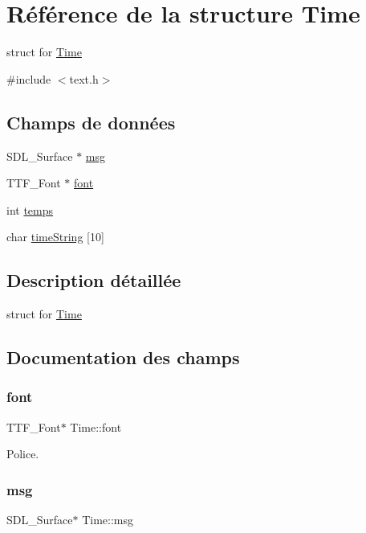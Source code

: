 \hypertarget{structTime}{}\section{Référence de la structure Time}
\label{structTime}


struct for \hyperlink{structTime}{Time}  




{\ttfamily \#include $<$text.\+h$>$}

\subsection*{Champs de données}
\begin{DoxyCompactItemize}
\item 
S\+D\+L\+\_\+\+Surface $\ast$ \hyperlink{structTime_a75df5e60edca4a4555029589f430f72e}{msg}
\item 
T\+T\+F\+\_\+\+Font $\ast$ \hyperlink{structTime_a870d34231ad11f87e284a0fd74b22f33}{font}
\item 
int \hyperlink{structTime_a11f3327ad1d256262bfa22b7e0553b60}{temps}
\item 
char \hyperlink{structTime_a6d30063c4d2f746ce34949138a2be479}{time\+String} \mbox{[}10\mbox{]}
\end{DoxyCompactItemize}


\subsection{Description détaillée}
struct for \hyperlink{structTime}{Time} 

\subsection{Documentation des champs}
\mbox{\label{structTime_a870d34231ad11f87e284a0fd74b22f33}} 
\subsubsection{\texorpdfstring{font}{font}}
{\footnotesize\ttfamily T\+T\+F\+\_\+\+Font$\ast$ Time\+::font}

Police. \mbox{\label{structTime_a75df5e60edca4a4555029589f430f72e}} 
\subsubsection{\texorpdfstring{msg}{msg}}
{\footnotesize\ttfamily S\+D\+L\+\_\+\+Surface$\ast$ Time\+::msg}


